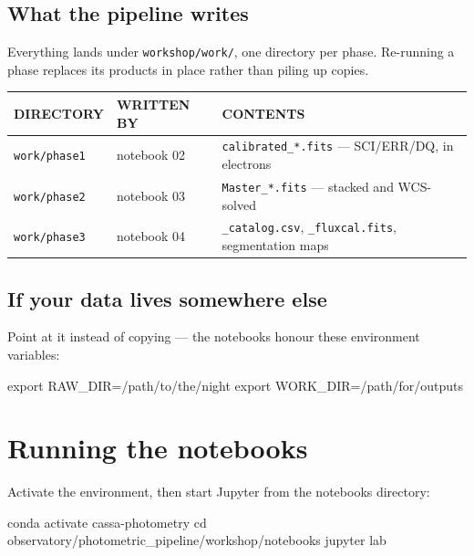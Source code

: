 \documentclass[11pt,a4paper]{article}
\newcommand{\cm}[1]{\texttt{\small #1}}
\newcommand{\thead}[1]{{\sffamily\bfseries\scriptsize\color{inkfaint}\MakeUppercase{#1}}}
\begin{document}
\subsection{What the pipeline writes}
Everything lands under \cm{workshop/work/}, one directory per phase. Re-running a phase
replaces its products in place rather than piling up copies.

\vspace{4pt}
\begin{tabularx}{\textwidth}{@{}p{2.9cm}p{2.5cm}X@{}}
\toprule
\thead{Directory} & \thead{Written by} & \thead{Contents} \\
\midrule
\cm{work/phase1} & notebook 02 & \cm{calibrated\_*.fits} --- SCI/ERR/DQ, in electrons \\
\cm{work/phase2} & notebook 03 & \cm{Master\_*.fits} --- stacked and WCS-solved \\
\cm{work/phase3} & notebook 04 & \cm{*\_catalog.csv}, \cm{*\_fluxcal.fits}, segmentation maps \\
\bottomrule
\end{tabularx}

\subsection{If your data lives somewhere else}
Point at it instead of copying --- the notebooks honour these environment variables:

\begin{cmd}
\begin{cmdtext}
export RAW_DIR=/path/to/the/night
export WORK_DIR=/path/for/outputs
\end{cmdtext}
\end{cmd}

\section{Running the notebooks}
Activate the environment, then start Jupyter from the notebooks directory:

\begin{cmd}
\begin{cmdtext}
conda activate cassa-photometry
cd observatory/photometric_pipeline/workshop/notebooks
jupyter lab
\end{cmdtext}
\end{cmd}
\end{document}

